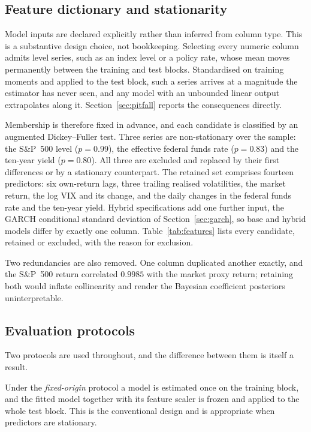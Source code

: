 \subsection{Feature dictionary and stationarity}
\label{sec:features}

Model inputs are declared explicitly rather than inferred from column type. This
is a substantive design choice, not bookkeeping. Selecting every numeric column
admits level series, such as an index level or a policy rate, whose mean moves
permanently between the training and test blocks. Standardised on training
moments and applied to the test block, such a series arrives at a magnitude the
estimator has never seen, and any model with an unbounded linear output
extrapolates along it. Section~\ref{sec:pitfall} reports the consequences
directly.

Membership is therefore fixed in advance, and each candidate is classified by an
augmented Dickey--Fuller test. Three series are non-stationary over the sample:
the S\&P~500 level ($p=0.99$), the effective federal funds rate ($p=0.83$) and
the ten-year yield ($p=0.80$). All three are excluded and replaced by their
first differences or by a stationary counterpart. The retained set comprises
fourteen predictors: six own-return lags, three trailing realised volatilities,
the market return, the log VIX and its change, and the daily changes in the
federal funds rate and the ten-year yield. Hybrid specifications add one further
input, the GARCH conditional standard deviation of
Section~\ref{sec:garch}, so base and hybrid models differ by exactly one column.
Table~\ref{tab:features} lists every candidate, retained or excluded, with the
reason for exclusion.

Two redundancies are also removed. One column duplicated another exactly, and
the S\&P~500 return correlated $0.9985$ with the market proxy return; retaining
both would inflate collinearity and render the Bayesian coefficient posteriors
uninterpretable.

\subsection{Evaluation protocols}
\label{sec:protocols}

Two protocols are used throughout, and the difference between them is itself a
result.

Under the \emph{fixed-origin} protocol a model is estimated once on the training
block, and the fitted model together with its feature scaler is frozen and
applied to the whole test block. This is the conventional design and is
appropriate when predictors are stationary.


